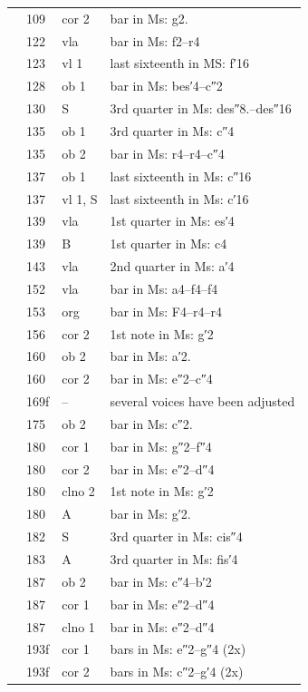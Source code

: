 \documentclass[parskip=full]{scrreprt}
\begin{document}
\begin{longtable}{lll L{10cm}}
	  & 109  & cor 2   & bar in Ms: g2. \\
	  & 122  & vla     & bar in Ms: f2–r4 \\
	  & 123  & vl 1    & last sixteenth in MS: f′16 \\
	  & 128  & ob 1    & bar in Ms: bes′4–c″2 \\
	  & 130  & S       & 3rd quarter in Ms: des″8.–des″16 \\
	  & 135  & ob 1    & 3rd quarter in Ms: c″4 \\
	  & 135  & ob 2    & bar in Ms: r4–r4–c″4 \\
	  & 137  & ob 1    & last sixteenth in Ms: c″16 \\
	  & 137  & vl 1, S & last sixteenth in Ms: c′16 \\
	  & 139  & vla     & 1st quarter in Ms: es′4 \\
	  & 139  & B       & 1st quarter in Ms: c4 \\
	  & 143  & vla     & 2nd quarter in Ms: a′4 \\
	  & 152  & vla     & bar in Ms: a4–f4–f4 \\
	  & 153  & org     & bar in Ms: F4–r4–r4 \\
	  & 156  & cor 2   & 1st note in Ms: g′2 \\
	  & 160  & ob 2    & bar in Ms: a′2. \\
	  & 160  & cor 2   & bar in Ms: e″2–c″4 \\
	  & 169f & –       & several voices have been adjusted \\
	  & 175  & ob 2    & bar in Ms: c″2. \\
	  & 180  & cor 1   & bar in Ms: g″2–f″4 \\
	  & 180  & cor 2   & bar in Ms: e″2–d″4 \\
	  & 180  & clno 2  & 1st note in Ms: g′2 \\
	  & 180  & A       & bar in Ms: g′2. \\
	  & 182  & S       & 3rd quarter in Ms: cis″4 \\
	  & 183  & A       & 3rd quarter in Ms: fis′4 \\
	  & 187  & ob 2    & bar in Ms: c″4–b′2 \\
	  & 187  & cor 1   & bar in Ms: e″2–d″4 \\
	  & 187  & clno 1  & bar in Ms: e″2–d″4 \\
	  & 193f & cor 1   & bars in Ms: e″2–g″4 (2x) \\
	  & 193f & cor 2   & bars in Ms: c″2–g′4 (2x) \\

\end{longtable}
\end{document}
